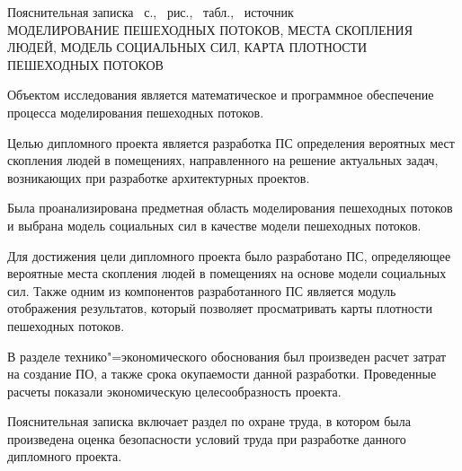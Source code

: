 \thispagestyle{empty}

\begin{center}
  Пояснительная записка~\pageref*{LastPage} с., \totfig{}~рис., \tottab{}~табл., \totref{}~источник \\
  \MakeUppercase{моделирование пешеходных потоков, места скопления людей, модель социальных сил, карта плотности пешеходных потоков}
\end{center}

\vspace{1.0\parsep}

Объектом исследования является математическое и программное обеспечение процесса моделирования пешеходных потоков.

Целью дипломного проекта является разработка ПС определения вероятных мест скопления людей в помещениях,
направленного на решение актуальных задач, возникающих при разработке архитектурных проектов.

Была проанализирована предметная область моделирования пешеходных потоков и выбрана модель социальных сил в качестве модели пешеходных потоков.

Для достижения цели дипломного проекта было разработано ПС, определяющее вероятные места скопления людей в помещениях на основе модели социальных сил.
Также одним из компонентов разработанного ПС является модуль отображения результатов, который позволяет просматривать карты плотности пешеходных потоков.

В разделе технико"=экономического обоснования был произведен расчет затрат на создание ПО, а также срока окупаемости данной разработки.
Проведенные расчеты показали экономическую целесообразность проекта.

Пояснительная записка включает раздел по охране труда, в котором была произведена оценка безопасности условий труда при разработке данного дипломного проекта.

\clearpage
